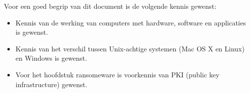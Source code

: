 Voor een goed begrip van dit document is de volgende kennis gewenst:
\begin{itemize}
	\item Kennis van de werking van computers met hardware, software en applicaties is gewenst.
	\item Kennis van het verschil tussen Unix-achtige systemen (Mac OS X en Linux) en Windows is gewenst.
	\item Voor het hoofdstuk ransomeware is voorkennis van PKI (public key infrastructure) gewenst.
\end{itemize}
